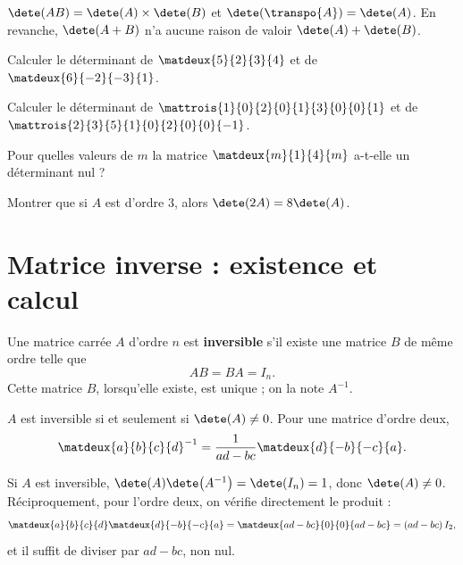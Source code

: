 \begin{propriete}
$\dete(AB) = \dete(A)\times\dete(B)$ et
$\dete\!\left(\transpo{A}\right) = \dete(A)$. En revanche,
$\dete(A+B)$ n'a aucune raison de valoir $\dete(A)+\dete(B)$.
\end{propriete}

\begin{entrainement}[déterminants]
\exo[\niveau{1}] Calculer le déterminant de $\matdeux{5}{2}{3}{4}$ et de
$\matdeux{6}{-2}{-3}{1}$.

\exo[\niveau{2}] Calculer le déterminant de
$\mattrois{1}{0}{2}{0}{1}{3}{0}{0}{1}$ et de
$\mattrois{2}{3}{5}{1}{0}{2}{0}{0}{-1}$.

\exo[\niveau{2}] Pour quelles valeurs de $m$ la matrice
$\matdeux{m}{1}{4}{m}$ a-t-elle un déterminant nul ?

\exo[\niveau{3}] Montrer que si $A$ est d'ordre $3$, alors
$\dete(2A) = 8\dete(A)$.
\end{entrainement}

\section{Matrice inverse : existence et calcul}

\begin{definition}
Une matrice carrée $A$ d'ordre $n$ est \textbf{inversible} s'il existe une
matrice $B$ de même ordre telle que
\[
  AB = BA = I_{n}.
\]
Cette matrice $B$, lorsqu'elle existe, est unique ; on la note $A^{-1}$.
\end{definition}

\begin{theoreme}
$A$ est inversible si et seulement si $\dete(A) \neq 0$. Pour une matrice
d'ordre deux,
\[
  \matdeux{a}{b}{c}{d}^{-1}
  = \frac{1}{ad-bc}\matdeux{d}{-b}{-c}{a}.
\]
\end{theoreme}

\begin{demonstration}
Si $A$ est inversible, $\dete(A)\dete\!\left(A^{-1}\right) = \dete(I_{n}) = 1$,
donc $\dete(A) \neq 0$. Réciproquement, pour l'ordre deux, on vérifie
directement le produit :
\[
  \matdeux{a}{b}{c}{d}\matdeux{d}{-b}{-c}{a}
  = \matdeux{ad-bc}{0}{0}{ad-bc} = (ad-bc)\,I_{2},
\]
et il suffit de diviser par $ad-bc$, non nul.
\end{demonstration}

